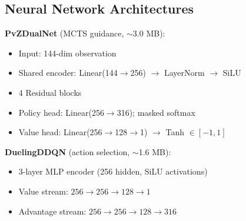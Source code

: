 \documentclass[conference]{IEEEtran}
\begin{document}
\subsection{Neural Network Architectures}
\textbf{PvZDualNet} (MCTS guidance, $\sim$3.0 MB):
\begin{itemize}[leftmargin=*,nosep]
    \item Input: 144-dim observation
    \item Shared encoder: Linear(144$\to$256) $\to$ LayerNorm $\to$ SiLU
    \item 4 Residual blocks
    \item Policy head: Linear(256$\to$316); masked softmax
    \item Value head: Linear(256$\to$128$\to$1) $\to$ Tanh $\in [-1,1]$
\end{itemize}

\textbf{DuelingDDQN} (action selection, $\sim$1.6 MB):
\begin{itemize}[leftmargin=*,nosep]
    \item 3-layer MLP encoder (256 hidden, SiLU activations)
    \item Value stream: $256 \to 256 \to 128 \to 1$
    \item Advantage stream: $256 \to 256 \to 128 \to 316$
\end{itemize}
\end{document}
